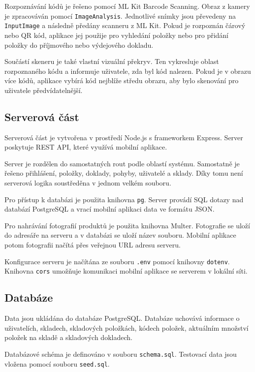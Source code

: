 \documentclass[czech, oth, kiv, he, pdf, viewonly]{fasthesis}
\begin{document}
Rozpoznávání kódů je řešeno pomocí ML Kit Barcode Scanning. Obraz
z kamery je zpracováván pomocí \texttt{ImageAnalysis}. Jednotlivé
snímky jsou převedeny na \texttt{InputImage} a následně předány
scanneru z ML Kit. Pokud je rozpoznán čárový nebo QR kód, aplikace jej
použije pro vyhledání položky nebo pro přidání položky do příjmového
nebo výdejového dokladu.

Součástí skeneru je také vlastní vizuální překryv. Ten vykresluje
oblast rozpoznaného kódu a informuje uživatele, zda byl kód nalezen.
Pokud je v obrazu více kódů, aplikace vybírá kód nejblíže středu
obrazu, aby bylo skenování pro uživatele předvídatelnější.

\subsection{Serverová část}

Serverová část je vytvořena v prostředí Node.js s frameworkem Express.
Server poskytuje REST API, které využívá mobilní aplikace.

Server je rozdělen do samostatných rout podle oblastí systému.
Samostatně je řešeno přihlášení, položky, doklady, pohyby, uživatelé
a sklady. Díky tomu není serverová logika soustředěna v jednom velkém
souboru.

Pro přístup k databázi je použita knihovna \texttt{pg}. Server provádí
SQL dotazy nad databází PostgreSQL a vrací mobilní aplikaci data ve
formátu JSON.

Pro nahrávání fotografií produktů je použita knihovna Multer.
Fotografie se uloží do adresáře na serveru a v databázi se uloží název
souboru. Mobilní aplikace potom fotografii načítá přes veřejnou URL
adresu serveru.

Konfigurace serveru je načítána ze souboru \texttt{.env} pomocí
knihovny \texttt{dotenv}. Knihovna \texttt{cors} umožňuje komunikaci
mobilní aplikace se serverem v lokální síti.

\subsection{Databáze}

Data jsou ukládána do databáze PostgreSQL. Databáze uchovává informace
o uživatelích, skladech, skladových položkách, kódech položek,
aktuálním množství položek na skladě a skladových dokladech.

Databázové schéma je definováno v souboru \texttt{schema.sql}.
Testovací data jsou vložena pomocí souboru \texttt{seed.sql}.
\end{document}
